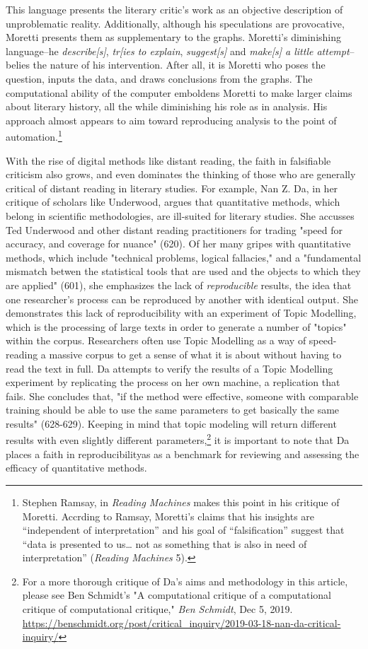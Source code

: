 \documentclass[11pt]{article}
\begin{document}
This language presents the literary critic's work as an objective
description of unproblematic reality. Additionally, although his
speculations are provocative, Moretti presents them as supplementary
to the graphs. Moretti’s diminishing language--he \emph{describe[s]},
\emph{tr[ies to explain}, \emph{suggest[s]} and \emph{make[s] a little
attempt}--belies the nature of his intervention. After all, it is
Moretti who poses the question, inputs the data, and draws conclusions
from the graphs. The computational ability of the computer emboldens
Moretti to make larger claims about literary history, all the while
diminishing his role as in analysis. His approach almost appears to
aim toward reproducing analysis to the point of automation.\footnote{Stephen Ramsay, in \emph{Reading Machines} makes this point in his
critique of Moretti. Accrding to Ramsay, Moretti’s claims that his
insights are “independent of interpretation” and his goal of
“falsification” suggest that “data is presented to us…  not as
something that is also in need of interpretation” (\emph{Reading Machines}
5).}

With the rise of digital methods like distant reading, the faith in
falsifiable criticism also grows, and even dominates the thinking of
those who are generally critical of distant reading in literary
studies. For example, Nan Z. Da, in her critique of scholars like
Underwood, argues that quantitative methods, which belong in
scientific methodologies, are ill-suited for literary studies. She
accusses Ted Underwood and other distant reading practitioners for
trading "speed for accuracy, and coverage for nuance" (620). Of her
many gripes with quantitative methods, which include "technical
problems, logical fallacies," and a "fundamental mismatch betwen the
statistical tools that are used and the objects to which they are
applied" (601), she emphasizes the lack of \emph{reproducible} results, the
idea that one researcher's process can be reproduced by another with
identical output. She demonstrates this lack of reproducibility with
an experiment of Topic Modelling, which is the processing of large
texts in order to generate a number of "topics" within the
corpus. Researchers often use Topic Modelling as a way of
speed-reading a massive corpus to get a sense of what it is about
without having to read the text in full. Da attempts to verify the
results of a Topic Modelling experiment by replicating the process on
her own machine, a replication that fails. She concludes that, "if the
method were effective, someone with comparable training should be able
to use the same parameters to get basically the same results"
(628-629). Keeping in mind that topic modeling will return different
results with even slightly different parameters,\footnote{For a more thorough critique of Da's aims and methodology in
this article, please see Ben Schmidt's "A computational critique of a
computational critique of computational critique," \emph{Ben Schmidt}, Dec
5, 2019. \url{https://benschmidt.org/post/critical\_inquiry/2019-03-18-nan-da-critical-inquiry/}} it is important
to note that Da places a faith in reproducibilityas as a benchmark for
reviewing and assessing the efficacy of quantitative methods.
\end{document}
